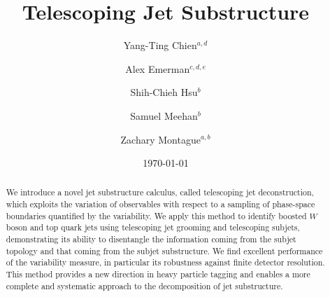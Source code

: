 \documentclass[aps,prl,floatfix,preprintnumbers,twocolumn,groupedaddress,nofootinbib]{revtex4-1}
\begin{document}
\title{Telescoping Jet Substructure}

\author{Yang-Ting Chien$^{a,d}$}

\author{Alex Emerman$^{c,d,e}$}

\author{Shih-Chieh Hsu$^b$}

\author{Samuel Meehan$^b$}

\author{Zachary Montague$^{a,b}$}


\date{\today}
\linenumbers

\begin{abstract}
We introduce a novel jet substructure calculus, called telescoping jet deconstruction, which exploits the variation of observables with respect to a sampling of phase-space boundaries quantified by the variability. We apply this method to identify boosted $W$ boson and top quark jets using telescoping jet grooming and telescoping subjets, demonstrating its ability to disentangle the information coming from the subjet topology and that coming from the subjet substructure. We find excellent performance of the variability measure, in particular its robustness against finite detector resolution. This method provides a new direction in heavy particle tagging and enables a more complete and systematic approach to the decomposition of jet substructure.
\end{abstract}
\maketitle
\end{document}
